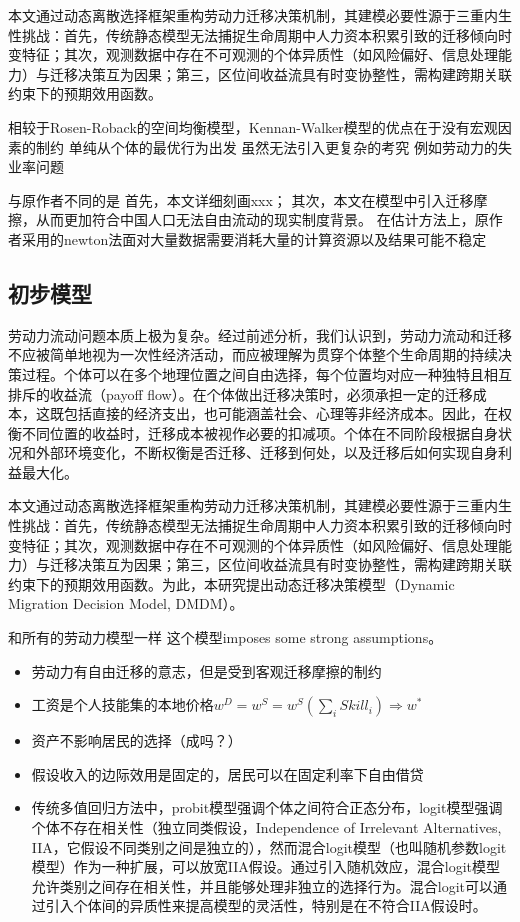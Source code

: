 \documentclass[a4paper,12pt]{article}
\begin{document}
本文通过动态离散选择框架重构劳动力迁移决策机制，其建模必要性源于三重内生性挑战：首先，传统静态模型无法捕捉生命周期中人力资本积累引致的迁移倾向时变特征；其次，观测数据中存在不可观测的个体异质性（如风险偏好、信息处理能力）与迁移决策互为因果；第三，区位间收益流具有时变协整性，需构建跨期关联约束下的预期效用函数。

相较于Rosen-Roback的空间均衡模型，Kennan-Walker模型的优点在于没有宏观因素的制约
单纯从个体的最优行为出发
虽然无法引入更复杂的考究 例如劳动力的失业率问题

与原作者不同的是
首先，本文详细刻画xxx；
其次，本文在模型中引入迁移摩擦，从而更加符合中国人口无法自由流动的现实制度背景。
在估计方法上，原作者采用的newton法面对大量数据需要消耗大量的计算资源以及结果可能不稳定

\subsection{初步模型}

劳动力流动问题本质上极为复杂。经过前述分析，我们认识到，劳动力流动和迁移不应被简单地视为一次性经济活动，而应被理解为贯穿个体整个生命周期的持续决策过程。个体可以在多个地理位置之间自由选择，每个位置均对应一种独特且相互排斥的收益流（payoff flow）。在个体做出迁移决策时，必须承担一定的迁移成本，这既包括直接的经济支出，也可能涵盖社会、心理等非经济成本。因此，在权衡不同位置的收益时，迁移成本被视作必要的扣减项。个体在不同阶段根据自身状况和外部环境变化，不断权衡是否迁移、迁移到何处，以及迁移后如何实现自身利益最大化。

本文通过动态离散选择框架重构劳动力迁移决策机制，其建模必要性源于三重内生性挑战：首先，传统静态模型无法捕捉生命周期中人力资本积累引致的迁移倾向时变特征；其次，观测数据中存在不可观测的个体异质性（如风险偏好、信息处理能力）与迁移决策互为因果；第三，区位间收益流具有时变协整性，需构建跨期关联约束下的预期效用函数。为此，本研究提出动态迁移决策模型（Dynamic Migration Decision Model, DMDM）。

和所有的劳动力模型一样 这个模型imposes some strong assumptions。
\begin{itemize}
\item 劳动力有自由迁移的意志，但是受到客观迁移摩擦的制约
\item 工资是个人技能集的本地价格$w^{D}=w^{S}=w^{S}(\sum\limits_{i}Skill_{i})\Rightarrow w^{*}$
\item 资产不影响居民的选择（成吗？）
\item 假设收入的边际效用是固定的，居民可以在固定利率下自由借贷
\item 传统多值回归方法中，probit模型强调个体之间符合正态分布，logit模型强调个体不存在相关性（独立同类假设，Independence of Irrelevant Alternatives, IIA，它假设不同类别之间是独立的），然而混合logit模型（也叫随机参数logit模型）作为一种扩展，可以放宽IIA假设。通过引入随机效应，混合logit模型允许类别之间存在相关性，并且能够处理非独立的选择行为。混合logit可以通过引入个体间的异质性来提高模型的灵活性，特别是在不符合IIA假设时。
\end{itemize}
\end{document}
